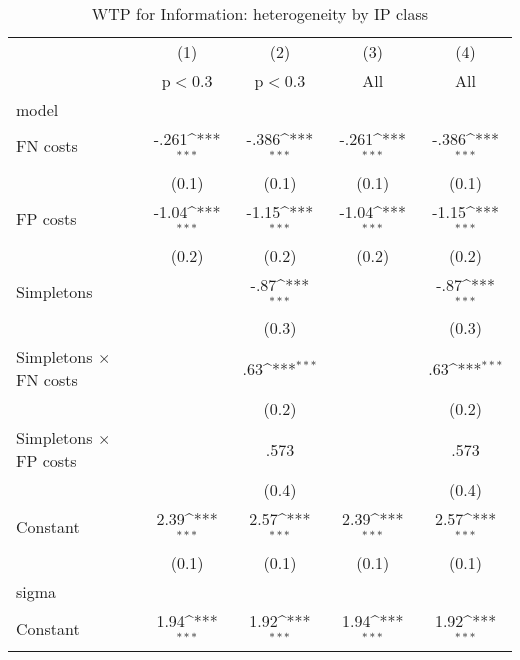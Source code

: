 \begin{table}[htbp]\centering
\def\sym#1{\ifmmode^{#1}\else\(^{#1}\)\fi}
\caption{WTP for Information: heterogeneity by IP class}
\begin{tabular}{l*{4}{c}}
\hline\hline
                &\multicolumn{1}{c}{(1)}&\multicolumn{1}{c}{(2)}&\multicolumn{1}{c}{(3)}&\multicolumn{1}{c}{(4)}\\
                &\multicolumn{1}{c}{p$<$0.3}&\multicolumn{1}{c}{p$<$0.3}&\multicolumn{1}{c}{All}&\multicolumn{1}{c}{All}\\
\hline
model           &                  &                  &                  &                  \\
FN costs        &    -.261\sym{***}&    -.386\sym{***}&    -.261\sym{***}&    -.386\sym{***}\\
                &    (0.1)         &    (0.1)         &    (0.1)         &    (0.1)         \\
FP costs        &    -1.04\sym{***}&    -1.15\sym{***}&    -1.04\sym{***}&    -1.15\sym{***}\\
                &    (0.2)         &    (0.2)         &    (0.2)         &    (0.2)         \\
Simpletons      &                  &     -.87\sym{***}&                  &     -.87\sym{***}\\
                &                  &    (0.3)         &                  &    (0.3)         \\
Simpletons $\times$ FN costs&                  &      .63\sym{***}&                  &      .63\sym{***}\\
                &                  &    (0.2)         &                  &    (0.2)         \\
Simpletons $\times$ FP costs&                  &     .573         &                  &     .573         \\
                &                  &    (0.4)         &                  &    (0.4)         \\
Constant        &     2.39\sym{***}&     2.57\sym{***}&     2.39\sym{***}&     2.57\sym{***}\\
                &    (0.1)         &    (0.1)         &    (0.1)         &    (0.1)         \\
\hline
sigma           &                  &                  &                  &                  \\
Constant        &     1.94\sym{***}&     1.92\sym{***}&     1.94\sym{***}&     1.92\sym{***}\\

\end{tabular}
\end{table}

